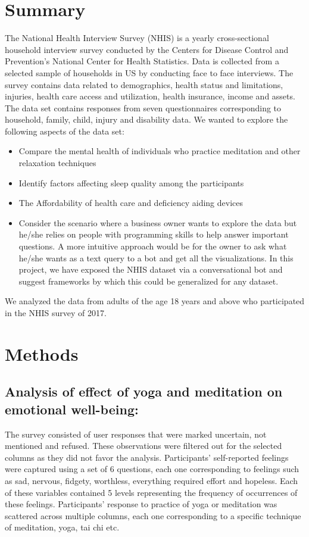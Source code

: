 \documentclass[12pt]{article}
\begin{document}
\section{Summary}
The National Health Interview Survey (NHIS) is a yearly cross-sectional household interview survey conducted by the Centers for Disease Control and Prevention’s National Center for Health Statistics. Data is collected from a selected sample of households in US by conducting face to face interviews. The survey contains data related to demographics, health status and limitations, injuries, health care access and utilization, health insurance, income and assets.
The data set contains responses from seven questionnaires corresponding to household, family, child, injury and disability data. We wanted to explore the following aspects of the data set: 
\begin{itemize}
\item Compare the mental health of individuals who practice meditation and other    relaxation techniques 
\item Identify factors affecting sleep quality among the participants
\item The Affordability of health care and deficiency aiding devices 
\item Consider the scenario where a business owner wants to explore the data but he/she relies on people with programming skills to help  answer important questions. A more intuitive approach would be for the owner to ask what he/she wants as a text query to a bot and get all the visualizations. In this project, we have exposed the NHIS dataset via a conversational bot and suggest frameworks by which this could be generalized for any dataset.
\end{itemize}

We analyzed the data from adults of the age 18 years and above who participated in the NHIS survey of 2017. 

\section{Methods}

\subsection{Analysis of effect of yoga and meditation on emotional well-being:}

The survey consisted of user responses that were marked uncertain, not mentioned and refused. These observations were filtered out for the selected columns as they did not favor the analysis.
Participants' self-reported feelings were captured using a set of 6 questions, each one corresponding to feelings such as sad, nervous, fidgety, worthless, everything required effort and hopeless. Each of these variables contained 5 levels representing the frequency of occurrences of these feelings. Participants' response to practice of yoga or meditation was scattered across multiple columns, each one corresponding to a specific technique of meditation, yoga, tai chi etc.    
\end{document}
